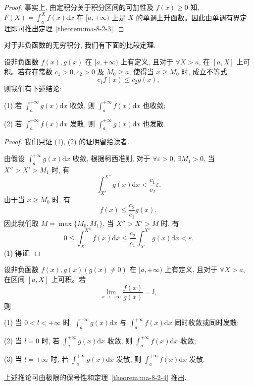 \begin{proof}
事实上, 由定积分关于积分区间的可加性及 $f(x)\geq0$ 知, $F(X)=\int_a^X f(x)\mathrm dx$ 在 $[a,+\infty)$ 上是 $X$ 的单调上升函数。因此由单调有界定理即可推出定理~\ref{theorem:ma-8-2-3}.
\end{proof}


对于非负函数的无穷积分, 我们有下面的比较定理.

\begin{theorem}\label{theorem:ma-8-2-4}
设非负函数 $f(x),g(x)$ 在 $[a,+\infty)$ 上有定义, 且对于 $\forall X>a$, 在 $[a,X]$ 上可积。若存在常数 $c_1>0,c_2>0$ 及 $M_0\geq a$, 使得当 $x\geq M_0$ 时, 成立不等式
\[
  c_1f(x)\leq c_2g(x),
\]
则我们有下述结论:

(1) 若 $\int_a^{+\infty}g(x)\mathrm dx$ 收敛, 则 $\int_a^{+\infty}f(x)\mathrm dx$ 也收敛;

(2) 若 $\int_a^{+\infty}f(x)\mathrm dx$ 发散, 则 $\int_a^{+\infty}g(x)\mathrm dx$ 也发散.
\end{theorem}


\begin{proof}
我们只证 (1), (2) 的证明留给读者.

由假设 $\int_a^{+\infty}g(x)\mathrm dx$ 收敛, 根据柯西准则, 对于 $\forall\varepsilon>0$, $\exists M_1>0$, 当 $X''>X'>M_1$ 时, 有
\[
  \int_{X'}^{X''}g(x)\mathrm dx<\frac{c_1}{c_2}\varepsilon.
\]
由于当 $x\geq M_0$ 时, 有
\[
  f(x)\leq \frac{c_2}{c_1}g(x),
\]
因此我们取 $M=\max\{M_0,M_1\}$, 当 $X''>X'>M$ 时, 有
\[
  0\leq \int_{X'}^{X''}f(x)\mathrm dx
  \leq
  \frac{c_2}{c_1}\int_{X'}^{X''}g(x)\mathrm dx<\varepsilon.
\]
(1) 得证.
\end{proof}


\begin{corollary}\label{corollary:ma-8-source-25}
设非负函数 $f(x),g(x)(g(x)\ne0)$ 在 $[a,+\infty)$ 上有定义, 且对于 $\forall X>a$, 在区间 $[a,X]$ 上可积。若
\[
  \lim_{x\to+\infty}\frac{f(x)}{g(x)}=l,
\]
则

(1) 当 $0<l<+\infty$ 时, $\int_a^{+\infty}g(x)\mathrm dx$ 与 $\int_a^{+\infty}f(x)\mathrm dx$ 同时收敛或同时发散;

(2) 当 $l=0$ 时, 若 $\int_a^{+\infty}g(x)\mathrm dx$ 收敛, 则 $\int_a^{+\infty}f(x)\mathrm dx$ 收敛;

(3) 当 $l=+\infty$ 时, 若 $\int_a^{+\infty}g(x)\mathrm dx$ 发散, 则 $\int_a^{+\infty}f(x)\mathrm dx$ 发散.
\end{corollary}

上述推论可由极限的保号性和定理~\ref{theorem:ma-8-2-4} 推出.

